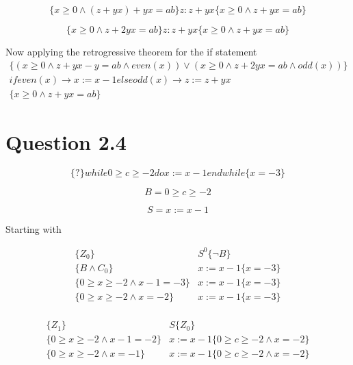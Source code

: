 \documentclass[10pt,a4paper]{article}
\begin{document}
\begin{equation}
\{x\geq 0 \wedge (z+yx) + yx = ab \}z:z+yx\{x\geq 0 \wedge z + yx = ab \}
\end{equation}

\begin{equation}
\{x\geq 0 \wedge z+ 2yx = ab \}z:z+yx\{x\geq 0 \wedge z + yx = ab \}
\end{equation}

Now applying the retrogressive theorem for the if statement
\begin{equation}
\begin{split}
 \{(x\geq 0 \wedge z + yx-y = ab \wedge even(x) )\vee (x\geq 0 \wedge z+ 2yx = ab \wedge odd(x))\}\\ if  even(x) \rightarrow x:=x-1 else  odd(x) \rightarrow z:= z+yx \\ \{x\geq 0 \wedge z + yx = ab \}
\end{split}
 \end{equation}

\section{Question 2.4}

\begin{equation}
 \{?\} while 0 \geq c \geq -2 do x:=x-1 endwhile \{x=-3\}
\end{equation}

\begin{equation}
 B = 0 \geq c \geq -2
\end{equation}

\begin{equation}
 S =  x:=x-1
\end{equation}

Starting with 

\begin{equation}
\begin{split}
 \{Z_0\}&S^0\{\neg B\}\\
 \{B \wedge C_0\}&x:=x-1\{x=-3\}\\
 \{ 0 \geq x \geq -2\wedge x-1=-3\}&x:=x-1\{x=-3\}\\
 \{ 0 \geq x \geq -2\wedge x=-2\}&x:=x-1\{x=-3\}\\
\end{split}
 \end{equation}

\begin{equation}
\begin{split}
 \{Z_1\}&S\{Z_0\}\\
  \{ 0 \geq x \geq -2\wedge x-1=-2\}&x:=x-1\{0 \geq c \geq -2\wedge x=-2\}\\
    \{ 0 \geq x \geq -2\wedge x=-1\}&x:=x-1\{0 \geq c \geq -2\wedge x=-2\}\\
\end{split}
  \end{equation}
\end{document}
